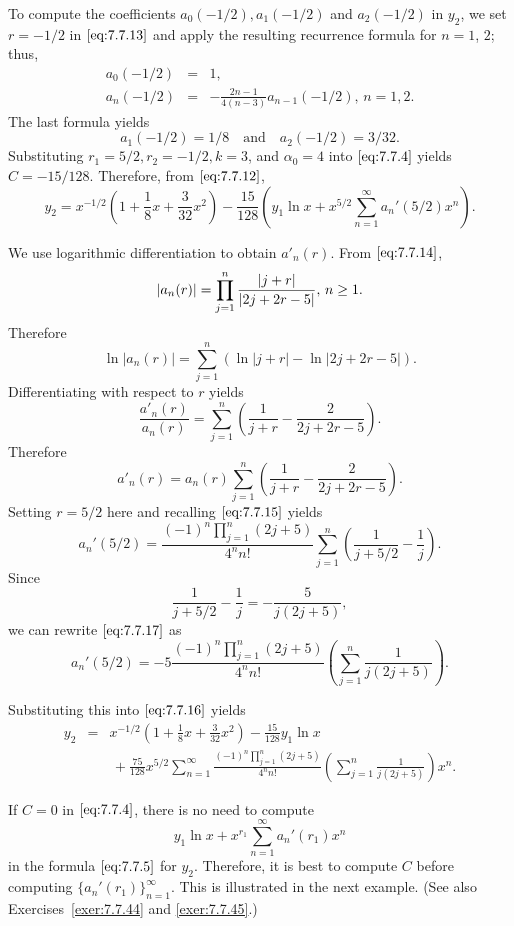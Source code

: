 \documentclass{ximera}
\begin{document}
\begin{example}
\begin{explanation}
To compute the coefficients $a_0(-1/2),a_1(-1/2)$ and $a_2(-1/2)$ in
$y_2$,
we set $r=-1/2$ in $\eqref{eq:7.7.13}$ and apply the resulting recurrence
formula for $n=1$, $2$;   thus,
\begin{eqnarray*}
a_0(-1/2)&=&1,\\
a_n(-1/2)&=&-\frac{2n-1}{4(n-3)}a_{n-1}(-1/2),\,n=1,2.
\end{eqnarray*}
The last formula  yields
$$
a_1(-1/2)=1/8 \quad\mbox{and}\quad a_2(-1/2)=3/32.
$$
Substituting $r_1=5/2,r_2=-1/2,k=3$, and $\alpha_0=4$ into
$\eqref{eq:7.7.4}$ yields $C=-15/128$.  Therefore, from
$\eqref{eq:7.7.12}$,
\begin{equation} \label{eq:7.7.16}
y_2=x^{-1/2}\left(1+\frac{1}{8}x+\frac{3}{32}x^2\right)
-\frac{15}{128}
\left(y_1\ln x+x^{5/2}\sum_{n=1}^\infty a_n'(5/2)x^n\right).
\end{equation}

We use logarithmic differentiation to obtain
$a'_n(r)$. From
$\eqref{eq:7.7.14}$,
$$
|a_n(r)|=\prod_{j=1}^n{|j+r|\over|2j+2r-5|},\,n\geq 1.
$$
Therefore
$$
\ln |a_n(r)|=\sum^n_{j=1} \left(\ln |j+r|-\ln|2j+2r-5|\right).
$$
Differentiating  with respect to $r$ yields
$$
\frac{a'_n(r)}{a_n(r)}=\sum^n_{j=1} \left(\frac{1}{j+r}-\frac{2}{2j+2r-5}\right).
$$
Therefore
$$
a'_n(r)=a_n(r) \sum^n_{j=1} \left(\frac{1}{j+r}-\frac{2}{2j+2r-5}\right).
$$
Setting $r=5/2$ here and recalling $\eqref{eq:7.7.15}$ yields
\begin{equation} \label{eq:7.7.17}
a_n'(5/2)=\frac{(-1)^n\prod_{j=1}^n(2j+5)}{4^nn!}\sum_{j=1}^n
\left(\frac{1}{j+5/2}-\frac{1}{j}\right).
\end{equation}
Since
$$
\frac{1}{j+5/2}-\frac{1}{j}=-\frac{5}{j(2j+5)},
$$
we can rewrite $\eqref{eq:7.7.17}$ as
$$
a_n'(5/2)=-5\frac{(-1)^n\prod_{j=1}^n(2j+5)}{4^nn!}
\left(\sum_{j=1}^n\frac{1}{j(2j+5)}\right).
$$

Substituting this into $\eqref{eq:7.7.16}$ yields
\begin{eqnarray*}
y_2&=&x^{-1/2}\left(1+\frac{1}{8}x+\frac{3}{32}x^2\right)-\frac{15}{128}
y_1\ln x\\
&&\,+\frac{75}{128}
x^{5/2}\sum_{n=1}^\infty
\frac{(-1)^n\prod_{j=1}^n(2j+5)}{4^nn!}
\left(\sum_{j=1}^n\frac{1}{j(2j+5)}\right)x^n.
\end{eqnarray*}

\end{explanation}
\end{example}

If $C=0$ in $\eqref{eq:7.7.4}$, there is no need to compute
$$
y_1\ln x+x^{r_1}\sum_{n=1}^\infty a_n'(r_1)x^n
$$
in the formula $\eqref{eq:7.7.5}$ for $y_2$. Therefore, it is best to
compute $C$ before computing $\{a_n'(r_1)\}_{n=1}^\infty$.
This is illustrated in the next example. 
(See also
Exercises~\ref{exer:7.7.44} and \ref{exer:7.7.45}.)
\end{document}
